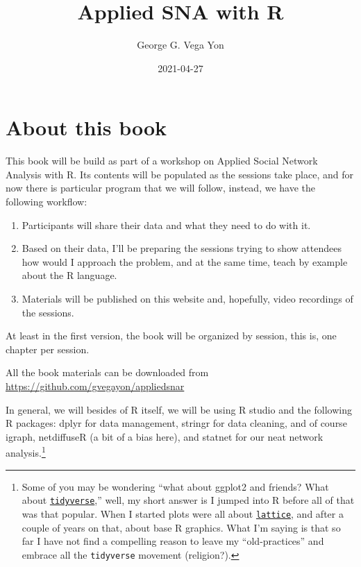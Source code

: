 \documentclass[
]{book}
\title{Applied SNA with R}
\author{George G. Vega Yon}
\date{2021-04-27}
\begin{document}
\maketitle

{
\setcounter{tocdepth}{1}
\tableofcontents
}
\hypertarget{about-this-book}{%
\chapter{About this book}\label{about-this-book}}

\renewcommand{\Pr}[1]{\mbox{Pr}\left(#1\right)}
\renewcommand{\exp}[1]{\mbox{exp}\left\{#1\right\}}

This book will be build as part of a workshop on Applied Social Network Analysis with R. Its contents will be populated as the sessions take place, and for now there is particular program that we will follow, instead, we have the following workflow:

\begin{enumerate}
\def\labelenumi{\arabic{enumi}.}
\item
  Participants will share their data and what they need to do with it.
\item
  Based on their data, I'll be preparing the sessions trying to show attendees how would I approach the problem, and at the same time, teach by example about the R language.
\item
  Materials will be published on this website and, hopefully, video recordings of the sessions.
\end{enumerate}

At least in the first version, the book will be organized by session, this is, one chapter per session.

All the book materials can be downloaded from \url{https://github.com/gvegayon/appliedsnar}

In general, we will besides of R itself, we will be using R studio and the following R packages: dplyr for data management, stringr for data cleaning, and of course igraph, netdiffuseR (a bit of a bias here), and statnet for our neat network analysis.\footnote{Some of you may be wondering ``what about ggplot2 and friends? What about \href{https://www.tidyverse.org/}{\texttt{tidyverse}},'' well, my short answer is I jumped into R before all of that was that popular. When I started plots were all about \href{https://CRAN.R-project.org/package=lattice}{\texttt{lattice}}, and after a couple of years on that, about base R graphics. What I'm saying is that so far I have not find a compelling reason to leave my ``old-practices'' and embrace all the \texttt{tidyverse} movement (religion?).}
\end{document}
